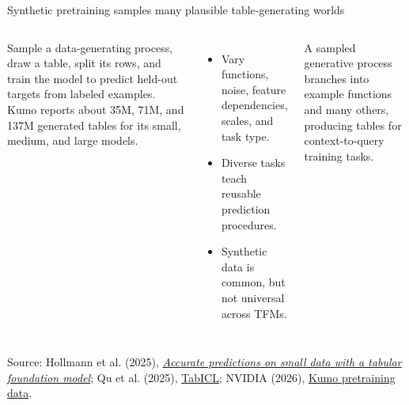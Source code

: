 \documentclass[11pt,aspectratio=169,hyperref={colorlinks}]{beamer}
\newcommand{\slidesource}[1]{\par\vfill\noindent\parbox{\linewidth}{\tiny\color{sourcegray}\raggedright\sloppy Source: #1.}}
\newcommand{\visualdescription}[1]{\par\vspace{.2em}\noindent\parbox{\linewidth}{\centering\tiny\color{sourcegray}#1}}
\begin{document}
\begin{frame}{Synthetic pretraining samples many plausible table-generating worlds}
\small
\begin{columns}[c]
Sample a data-generating process, draw a table, split its rows, and train the model to predict held-out targets from labeled examples. Kumo reports about 35M, 71M, and 137M generated tables for its small, medium, and large models.
\begin{itemize}\itemsep.4em
\item Vary functions, noise, feature dependencies, scales, and task type.
\item Diverse tasks teach reusable prediction procedures.
\item Synthetic data is common, but not universal across TFMs.
\end{itemize}
\centering
{}
\visualdescription{A sampled generative process branches into example functions and many others, producing tables for context-to-query training tasks.}
\end{columns}
\slidesource{Hollmann et al. (2025), \href{https://www.nature.com/articles/s41586-024-08328-6}{\emph{Accurate predictions on small data with a tabular foundation model}}; Qu et al. (2025), \href{https://proceedings.mlr.press/v267/qu25d.html}{TabICL}; NVIDIA (2026), \href{https://huggingface.co/blog/nvidia/kumo-tabular}{Kumo pretraining data}}
\end{frame}
\end{document}

